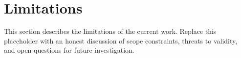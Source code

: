 
\section{Limitations}


This section describes the limitations of the current work.
Replace this placeholder with an honest discussion of scope constraints,
threats to validity, and open questions for future investigation.
